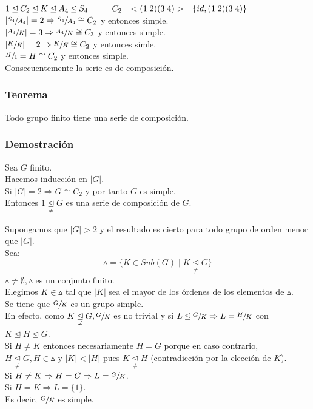 \documentclass[11pt,a4paper]{article}
\begin{document}
$1 \unlhd C_{2} \unlhd K \unlhd A_{4} \unlhd S_{4} \hspace{1cm} C_{2} = <(1 \hspace{0.1cm} 2)(3 \hspace{0.1cm} 4)> = \{id, (1 \hspace{0.1cm} 2)(3 \hspace{0.1cm} 4)\}$ \\
$|\sfrac{S_{4}}{A_{4}}| = 2 \Rightarrow \sfrac{S_{4}}{A_{4}} \cong C_{2}$ y entonces simple. \\
$|\sfrac{A_{4}}{K}| = 3 \Rightarrow \sfrac{A_{4}}{K} \cong C_{3}$ y entonces simple. \\
$|\sfrac{K}{H}| = 2 \Rightarrow \sfrac{K}{H} \cong C_{2}$ y entonces simle. \\
$\sfrac{H}{1} = H \cong C_{2}$ y entonces simple. \\
Consecuentemente la serie es de composición.

\subsubsection*{Teorema}

Todo grupo finito tiene una serie de composición.

\subsubsection*{Demostración}

Sea $G$ finito. \\
Hacemos inducción en $|G|$. \\
Si $|G| = 2 \Rightarrow G \cong C_{2}$ y por tanto $G$ es simple. \\
Entonces $1  \underset{\neq}{\unlhd} G$ es una serie de composición de $G$.

Supongamos que $|G| > 2$ y el resultado es cierto para todo grupo de orden menor que $|G|$. \\
Sea:
$$\vartriangle = \{K \in Sub(G) \mid K \underset{\neq}{\unlhd} G\}$$
$\vartriangle \neq \emptyset, \vartriangle$ es un conjunto finito. \\
Elegimos $K \in \vartriangle$ tal que $|K|$ sea el mayor de los órdenes de los elementos de $\vartriangle$. \\
Se tiene que $\sfrac{G}{K}$ es un grupo simple. \\
En efecto, como $K \underset{\neq}{\unlhd} G, \sfrac{G}{K}$ es no trivial y si $L \unlhd \sfrac{G}{K} \Rightarrow L = \sfrac{H}{K}$ con $K \unlhd H \unlhd G$. \\
Si $H \neq K$ entonces necesariamente $H = G$ porque en caso contrario, $H \underset{\neq}{\unlhd} G, H \in \vartriangle$ y $|K| < |H|$ pues $K \underset{\neq}{\unlhd} H$ (contradicción por la elección de $K$). \\
Si $H \neq K \Rightarrow H = G \Rightarrow L = \sfrac{G}{K}$. \\
Si $H = K \Rightarrow L = \{1\}$. \\
Es decir, $\sfrac{G}{K}$ es simple.
\end{document}
